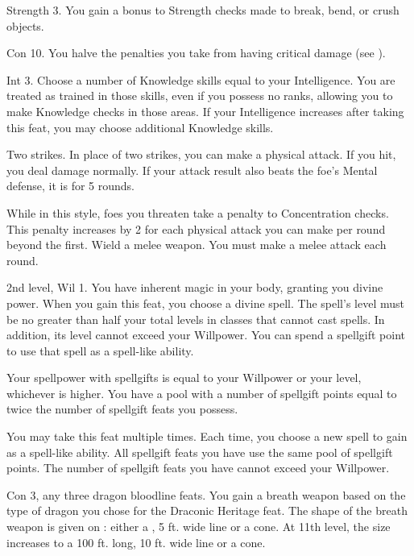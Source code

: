 \featpre Strength 3.
\featben You gain a  bonus to Strength checks made to break, bend, or crush objects.

\featpre Con 10.
\featben You halve the penalties you take from having critical damage (see ).

\featpre Int 3.
\featben Choose a number of Knowledge skills equal to your Intelligence.
You are treated as trained in those skills, even if you possess no ranks, allowing you to make Knowledge checks in those areas.
If your Intelligence increases after taking this feat, you may choose additional Knowledge skills.

\featpre Two strikes.
\featben In place of two strikes, you can make a physical attack.
If you hit, you deal damage normally.
If your attack result also beats the foe's Mental defense, it is \disoriented for 5 rounds.

\featben While in this style, foes you threaten take a  penalty to Concentration checks.
This penalty increases by 2 for each physical attack you can make per round beyond the first.
\stylereq Wield a melee weapon. You must make a melee attack each round.

\featpres 2nd level, Wil 1.
\featben You have inherent magic in your body, granting you divine power.
When you gain this feat, you choose a divine spell.
The spell's level must be no greater than half your total levels in classes that cannot cast spells.
In addition, its level cannot exceed your Willpower.
You can spend a spellgift point to use that spell as a spell-like ability.

Your spellpower with spellgifts is equal to your Willpower or your level, whichever is higher.
You have a pool with a number of spellgift points equal to twice the number of spellgift feats you possess.

You may take this feat multiple times.
Each time, you choose a new spell to gain as a spell-like ability.
All spellgift feats you have use the same pool of spellgift points.
The number of spellgift feats you have cannot exceed your Willpower.

\featpres Con 3, any three dragon bloodline feats.
\featben You gain a breath weapon based on the type of dragon you chose for the Draconic Heritage feat.
The shape of the breath weapon is given on : either a \arealarge, 5 ft. wide line or a \areamed cone.
At 11th level, the size increases to a 100 ft. long, 10 ft. wide line or a \arealarge cone.


